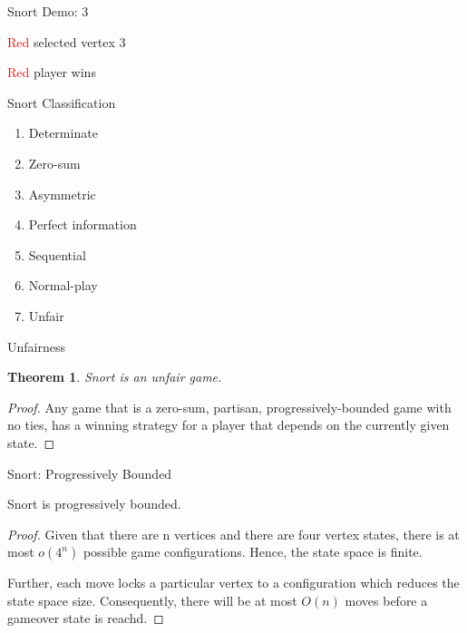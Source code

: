 \documentclass[mathserif]{beamer}
\newtheorem{thm}{Theorem}
\newcommand{\rplayer}{\textcolor{red}{Red }}
\begin{document}
\begin{frame}{Snort Demo: 3}
	\begin{figure}[h]
		\centering
		\begin{tikzpicture}
			
		\end{tikzpicture}
	\end{figure}
	\vfill
	\begin{center}
		\rplayer selected vertex $3$
	\end{center}
	\begin{center}
		\rplayer player wins
	\end{center}
\end{frame}

\begin{frame}{Snort Classification}
	\begin{enumerate}
		\item Determinate
		\item Zero-sum
		\item Asymmetric
		\item Perfect information
		\item Sequential
		\item Normal-play
		\item Unfair
	\end{enumerate}
\end{frame}

\begin{frame}{Unfairness}
	\begin{thm}
		Snort is an unfair game.
	\end{thm}
	\pause
	\vfill
	\begin{proof}
		Any game that is a zero-sum, partisan, progressively-bounded game with
		no ties, has a winning strategy for a player that depends on the
		currently given state.
	\end{proof}
	\pause
\end{frame}

\begin{frame}{Snort: Progressively Bounded}
	\begin{lemma}
		Snort is progressively bounded.
	\end{lemma}
	\begin{proof}
		Given that there are n vertices and there are four
		vertex states, there is at most $o(4^n)$ possible
		game configurations. Hence, the state space is
		finite.

		Further, each move locks a particular vertex to a
		configuration which reduces the state space size.
		Consequently, there will be at most $O(n)$ moves
		before a gameover state is reachd.
	\end{proof}
\end{frame}
\end{document}
